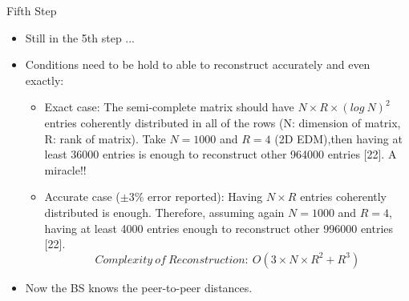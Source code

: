 \documentclass{beamer}
\begin{document}
\begin{frame}[t]{Fifth Step} %
\begin{itemize}
\item Still in the 5th step ...

\item Conditions need to be hold to able to reconstruct accurately and even exactly:

\begin{itemize}
\justifying
\item Exact case: The semi-complete matrix should have $N \times R \times (log \ N)^2$ entries coherently distributed in all of the rows (N: dimension of matrix, R: rank of matrix). Take $N=1000$ and $R=4$ (2D EDM),then having at least 36000 entries is enough to reconstruct other 964000 entries [22]. A miracle!!

\item Accurate case ($ \pm 3 \% $ error reported): Having $N \times R$ entries coherently distributed is enough. Therefore, assuming again $N=1000$ and $R=4$, having at least 4000 entries enough to reconstruct other 996000 entries [22].
\begin{equation}
Complexity \ of \ Reconstruction: \ O(3 \times N \times R^2 + R^3)
\end{equation}
\end{itemize}
\item Now the BS knows the peer-to-peer distances.

\end{itemize}
\end{frame}
\end{document}
